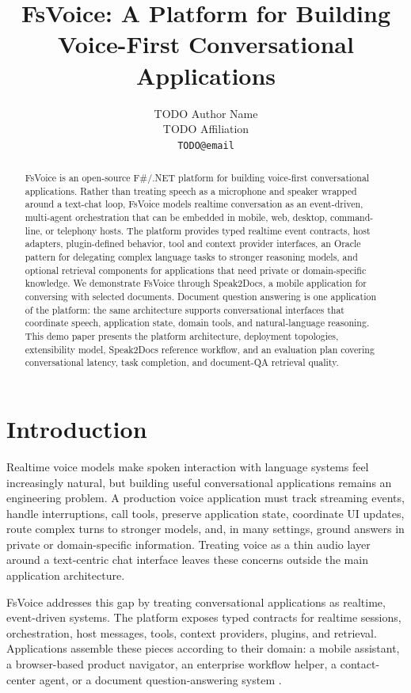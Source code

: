 \documentclass[11pt]{article}
\title{FsVoice: A Platform for Building Voice-First Conversational Applications}
\author{
  TODO Author Name \\
  TODO Affiliation \\
  \texttt{TODO@email}
}
\begin{document}
\maketitle
\begin{abstract}
FsVoice is an open-source F\#/.NET platform for building voice-first conversational applications. Rather than treating speech as a microphone and speaker wrapped around a text-chat loop, FsVoice models realtime conversation as an event-driven, multi-agent orchestration that can be embedded in mobile, web, desktop, command-line, or telephony hosts. The platform provides typed realtime event contracts, host adapters, plugin-defined behavior, tool and context provider interfaces, an Oracle pattern for delegating complex language tasks to stronger reasoning models, and optional retrieval components for applications that need private or domain-specific knowledge. We demonstrate FsVoice through Speak2Docs, a mobile application for conversing with selected documents. Document question answering is one application of the platform: the same architecture supports conversational interfaces that coordinate speech, application state, domain tools, and natural-language reasoning. This demo paper presents the platform architecture, deployment topologies, extensibility model, Speak2Docs reference workflow, and an evaluation plan covering conversational latency, task completion, and document-QA retrieval quality.
\end{abstract}

\section{Introduction}

Realtime voice models make spoken interaction with language systems feel increasingly natural, but building useful conversational applications remains an engineering problem. A production voice application must track streaming events, handle interruptions, call tools, preserve application state, coordinate UI updates, route complex turns to stronger models, and, in many settings, ground answers in private or domain-specific information. Treating voice as a thin audio layer around a text-centric chat interface leaves these concerns outside the main application architecture.

FsVoice addresses this gap by treating conversational applications as realtime, event-driven systems. The platform exposes typed contracts for realtime sessions, orchestration, host messages, tools, context providers, plugins, and retrieval. Applications assemble these pieces according to their domain: a mobile assistant, a browser-based product navigator, an enterprise workflow helper, a contact-center agent, or a document question-answering system \citep{fsvoice}.
\end{document}
